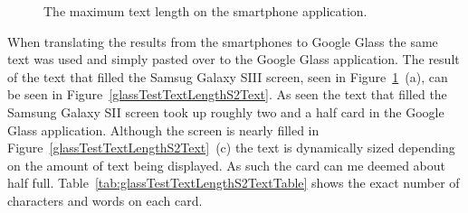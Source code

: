 	\begin{figure}[H]%
		\centering
   		 \qquad
   		 \qquad
		\caption{The maximum text length on the smartphone application.}
		\label{glassTestTextLengthRaw}
	\end{figure}

When translating the results from the smartphones to Google Glass the same text was used and simply pasted over to the Google Glass application. The result of the text that filled the Samsug Galaxy SIII screen, seen in Figure~\ref{glassTestTextLengthRaw}~(a), can be seen in Figure~\ref{glassTestTextLengthS2Text}. As seen the text that filled the Samsung Galaxy SII screen took up roughly two and a half card in the Google Glass application. Although the screen is nearly filled in Figure~\ref{glassTestTextLengthS2Text}~(c) the text is dynamically sized depending on the amount of text being displayed. As such the card can me deemed about half full. Table~\ref{tab:glassTestTextLengthS2TextTable} shows the exact number of characters and words on each card.

